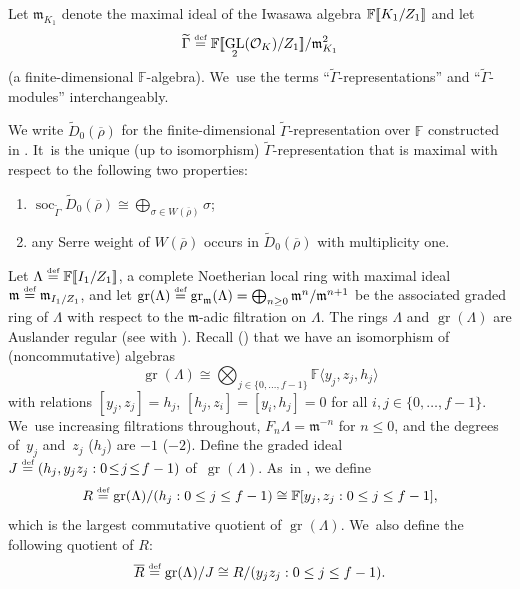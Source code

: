 \documentclass[JEP,XML,SOM,Unicode,NoFloatCountersInSection, NoEqCountersInSection,published]{cedram}
\let\wt\widetilde
\let\ovl\overline
\newcommand{\defeq}{\stackrel{\textrm{\tiny{\upshape{def}}}}{=}}
\newcommand{\F}{\mathbb{F}}
\newcommand{\cO}{\mathcal{O}}
\newcommand{\fm}{\mathfrak{m}}\let\m\fm
\newcommand{\brho}{\overline{\rho}}
\newcommand{\bbra}[1]{[\mkern-3mu[#1]\mkern-3mu]}
\DeclareMathOperator{\GL}{GL}
\DeclareMathOperator{\gr}{gr}
\DeclareMathOperator{\soc}{soc}
\theoremstyle{plain}
\theoremstyle{definition}
\begin{document}
Let $\fm_{K_1}$ denote the maximal ideal of {the Iwasawa algebra} $\F\bbra{K_1/Z_1}$ and let
\[
\wt{\Gamma}\defeq \F\bbra{\GL_2(\cO_K)/Z_1}/\fm_{K_1}^2
\]
(a finite-dimensional $\F$-algebra). We~use the terms ``$\wt{\Gamma}$-representations'' and ``$\wt{\Gamma}$\nobreakdash-mod\-ules'' interchangeably.

We write $\wt{D}_{0}(\brho)$ for the finite-dimensional $\wt{\Gamma}$-representation over $\F$ constructed in \cite[Prop.\,4.3]{HuWang2}. It~is the unique (up to isomorphism) $\wt{\Gamma}$-representation that is maximal with respect to the following two properties:
\begin{enumerate}
\item $\soc_{\wt{\Gamma}}\wt{D}_0(\brho)\cong\bigoplus_{\sigma\in W(\brho)}\sigma$;
\item any Serre weight of $W(\brho)$ occurs in $\wt{D}_0(\brho)$ with multiplicity one.
\end{enumerate}

Let $\Lambda \defeq \F\bbra{I_1/Z_1}$, a complete Noetherian local ring with maximal ideal $\m \defeq \m_{I_1/Z_1}$, and let $\gr(\Lambda) \defeq \gr_\m(\Lambda) = \bigoplus_{n\geq 0}\m^n/\m^{n+1}$ be the associated graded ring of $\Lambda$ with respect to the $\fm$-adic filtration on $\Lambda$. The rings $\Lambda$ and $\gr(\Lambda)$ are Auslander regular (see \cite[Th.\,5.3.4]{BHHMS1} with \cite[Th.\,III.2.2.5]{LiOy}). Recall (\cite[\S 3.1]{BHHMS2}) that we have an isomorphism of (noncommutative) algebras
\begin{equation}\label{eq:grlambda}
\gr(\Lambda)\cong \bigotimes_{j\in\{0,\dots,f-1\}}\F\langle y_j,z_j,h_j\rangle
\end{equation}
with relations $[y_j,z_j]=h_j$, $[h_j,z_i]=[y_i,h_j]=0$ for all $i,j\in\{0,\dots,f-1\}$. We~use increasing filtrations throughout, \ie $F_n \Lambda = \m^{-n}$ for $n \le 0$, and the degrees of~$y_j$ and~$z_j$ (\resp $h_j$) are $-1$ (\resp $-2$).
Define the graded ideal \hbox{$J \defeq (h_j,y_jz_j: 0 \!\le\! j \!\le\! f-1)$} of~$\gr(\Lambda)$. As~in \cite[\S 3]{BHHMS2}, we define
\[
R \defeq \gr(\Lambda)/(h_j: 0 \le j \le f-1) \cong \F[y_j,z_j: 0 \le j \le f-1],
\]
which is the largest commutative quotient of $\gr(\Lambda)$. We~also define the following quotient of $R$:
\[
\ovl R \defeq \gr(\Lambda)/J \cong R/(y_jz_j: 0 \le j \le f-1).
\]
\end{document}
